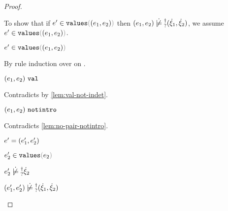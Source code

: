 \begin{proof}
\begin{byCases}
\begin{byCases}
\begin{byCases}
\begin{byCases}
\begin{byCases}
\begin{pfsteps*}
            \end{pfsteps*} 
            To show that if $\inValues{e'}{\hpair{e_1}{e_2}}$ then $\cnotsatisfyormay{\hpair{e_1}{e_2}}{\cpair{\hxi_1}{\hxi_2}}$, we assume $\inValues{e'}{\hpair{e_1}{e_2}}$.
            \begin{pfsteps*}
            \item $\inValues{e'}{\hpair{e_1}{e_2}}$  
            \end{pfsteps*}
            By rule induction over  on .
            \begin{byCases}
              \item[\text{(\ref{rule:IVVal})}]
              \begin{pfsteps*}
              \item $(e_1 , e_2) ~\mathtt{val}$ 
              \end{pfsteps*} 
              Contradicts  by \autoref{lem:val-not-indet}.
              \item[\text{(\ref{rule:IVIndet})}] 
              \begin{pfsteps*}
              \item $(e_1 , e_2) ~\mathtt{notintro}$ 
              \end{pfsteps*}
              Contradicts \autoref{lem:no-pair-notintro}.
              \item[\text{(\ref{rule:IVPair})}]
              \begin{pfsteps*}
              \item $e'=(e_1' , e_2')$ 
              \item $\inValues{e_2'}{e_2}$  
              \item $\cnotsatisfyormay{e_2'}{\hxi_2}$  
              \item $\cnotsatisfyormay{\hpair{e_1'}{e_2'}}{\cpair{\hxi_1}{\hxi_2}}$ 
              \end{pfsteps*} 
            \end{byCases}
          \end{byCases}
        \end{byCases}

\end{byCases}
\end{byCases}
\end{byCases}
\end{proof}
